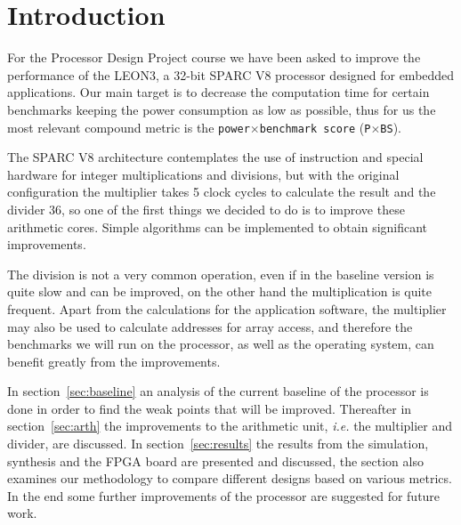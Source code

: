 
\section{Introduction}

For the Processor Design Project course we have been asked to improve the performance of the
LEON3, a 32-bit SPARC V8 processor designed for embedded applications.
Our main target is to decrease the computation time for certain benchmarks keeping the power
consumption as low as possible, thus for us the most relevant compound metric is the
\texttt{power}$\times$\texttt{benchmark score} (\texttt{P}$\times$\texttt{BS}).

The SPARC V8 architecture contemplates the use of instruction and special hardware for integer
multiplications and divisions, but with the original configuration the multiplier takes 5 clock cycles
to calculate the result and the divider 36, so one of the first things we decided to do is to improve
these arithmetic cores. Simple algorithms can be implemented to obtain significant improvements.

The division is not a very common operation, even if in the baseline version is quite slow and can be improved, on the other hand the multiplication is quite frequent. Apart from the calculations for the application software, the multiplier may also be used to calculate addresses for array access, and therefore the benchmarks we will run on the processor, as well as the operating system, can benefit greatly from the improvements.

In section~\ref{sec:baseline} an analysis of the current baseline of the processor is done in order to find the weak points that will be improved.
Thereafter in section~\ref{sec:arth} the improvements to the arithmetic unit, \emph{i.e.} the multiplier and divider, are discussed.
In section~\ref{sec:results} the results from the simulation, synthesis and the FPGA board are presented and discussed, the section also examines our methodology to compare different designs based on various metrics.
In the end some further improvements of the processor are suggested for future work.